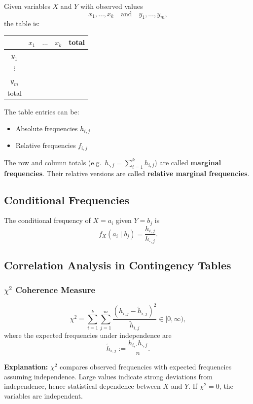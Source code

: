 \documentclass{article}
\begin{document}
Given variables $X$ and $Y$ with observed values
\[
x_1,\dots,x_k \quad \text{and} \quad y_1,\dots,y_m,
\]
the table is:

\begin{center}
\begin{tabular}{|c|c|c|c|c|}
\hline
 & $x_1$ & $\dots$ & $x_k$ & total \\
\hline
$y_1$ & & & & \\
\hline
$\vdots$ & & & & \\
\hline
$y_m$ & & & & \\
\hline
total & & & & \\
\hline
\end{tabular}
\end{center}

The table entries can be:
\begin{itemize}
\item Absolute frequencies $h_{i,j}$
\item Relative frequencies $f_{i,j}$
\end{itemize}

The row and column totals (e.g.\ $h_{\cdot,j} = \sum_{i=1}^{k} h_{i,j}$) are called \textbf{marginal frequencies}.
Their relative versions are called \textbf{relative marginal frequencies}.

\subsection{Conditional Frequencies}
The conditional frequency of $X = a_i$ given $Y = b_j$ is
\[
f_X(a_i \mid b_j) = \frac{h_{i,j}}{h_{\cdot,j}}.
\]

\subsection{Correlation Analysis in Contingency Tables}

\subsubsection{$\chi^2$ Coherence Measure}
\[
\chi^2 = \sum_{i = 1}^{k}\sum_{j=1}^{m}
\frac{(h_{i,j} - \tilde{h}_{i,j})^2}{\tilde{h}_{i,j}} \in [0,\infty),
\]
where the expected frequencies under independence are
\[
\tilde{h}_{i,j} := \frac{h_{i,\cdot} h_{\cdot,j}}{n}.
\]

\textbf{Explanation:}  
$\chi^2$ compares observed frequencies with expected frequencies assuming independence.
Large values indicate strong deviations from independence, hence statistical dependence between $X$ and $Y$.
If $\chi^2 = 0$, the variables are independent.
\end{document}

